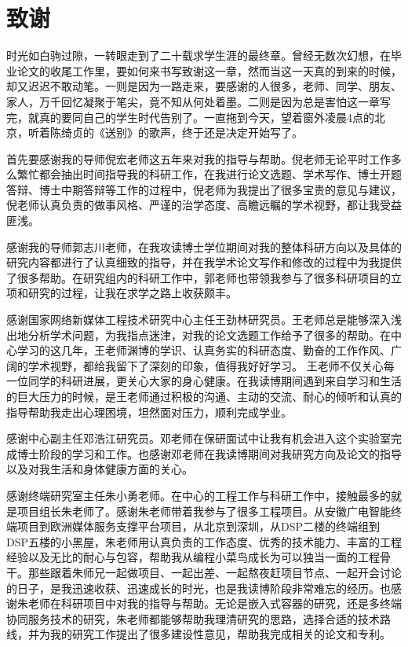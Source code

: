 \chapter[致谢]{致\quad 谢}%
\thispagestyle{noheaderstyle}%

时光如白驹过隙，一转眼走到了二十载求学生涯的最终章。曾经无数次幻想，在毕业论文的收尾工作里，要如何来书写致谢这一章，然而当这一天真的到来的时候，却又迟迟不敢动笔。一则是因为一路走来，要感谢的人很多，老师、同学、朋友、家人，万千回忆凝聚于笔尖，竟不知从何处着墨。二则是因为总是害怕这一章写完，就真的要同自己的学生时代告别了。一直拖到今天，望着窗外凌晨4点的北京，听着陈绮贞的《送别》的歌声，终于还是决定开始写了。

首先要感谢我的导师倪宏老师这五年来对我的指导与帮助。倪老师无论平时工作多么繁忙都会抽出时间指导我的科研工作，在我进行论文选题、学术写作、博士开题答辩、博士中期答辩等工作的过程中，倪老师为我提出了很多宝贵的意见与建议，倪老师认真负责的做事风格、严谨的治学态度、高瞻远瞩的学术视野，都让我受益匪浅。

感谢我的导师郭志川老师，在我攻读博士学位期间对我的整体科研方向以及具体的研究内容都进行了认真细致的指导，并在我学术论文写作和修改的过程中为我提供了很多帮助。在研究组内的科研工作中，郭老师也带领我参与了很多科研项目的立项和研究的过程，让我在求学之路上收获颇丰。

感谢国家网络新媒体工程技术研究中心主任王劲林研究员。王老师总是能够深入浅出地分析学术问题，为我指点迷津，对我的论文选题工作给予了很多的帮助。在中心学习的这几年，王老师渊博的学识、认真务实的科研态度、勤奋的工作作风、广阔的学术视野，都给我留下了深刻的印象，值得我好好学习。
王老师不仅关心每一位同学的科研进展，更关心大家的身心健康。在我读博期间遇到来自学习和生活的巨大压力的时候，是王老师通过积极的沟通、主动的交流、耐心的倾听和认真的指导帮助我走出心理困境，坦然面对压力，顺利完成学业。

感谢中心副主任邓浩江研究员。邓老师在保研面试中让我有机会进入这个实验室完成博士阶段的学习和工作。也感谢邓老师在我读博期间对我研究方向及论文的指导以及对我生活和身体健康方面的关心。

感谢终端研究室主任朱小勇老师。在中心的工程工作与科研工作中，接触最多的就是项目组长朱老师了。感谢朱老师带着我参与了很多工程项目。从安徽广电智能终端项目到欧洲媒体服务支撑平台项目，从北京到深圳，从DSP二楼的终端组到DSP五楼的小黑屋，朱老师用认真负责的工作态度、优秀的技术能力、丰富的工程经验以及无比的耐心与包容，帮助我从编程小菜鸟成长为可以独当一面的工程骨干。那些跟着朱师兄一起做项目、一起出差、一起熬夜赶项目节点、一起开会讨论的日子，是我迅速收获、迅速成长的时光，也是我读博阶段非常难忘的经历。也感谢朱老师在科研项目中对我的指导与帮助。无论是嵌入式容器的研究，还是多终端协同服务技术的研究，朱老师都能够帮助我理清研究的思路，选择合适的技术路线，并为我的研究工作提出了很多建设性意见，帮助我完成相关的论文和专利。

